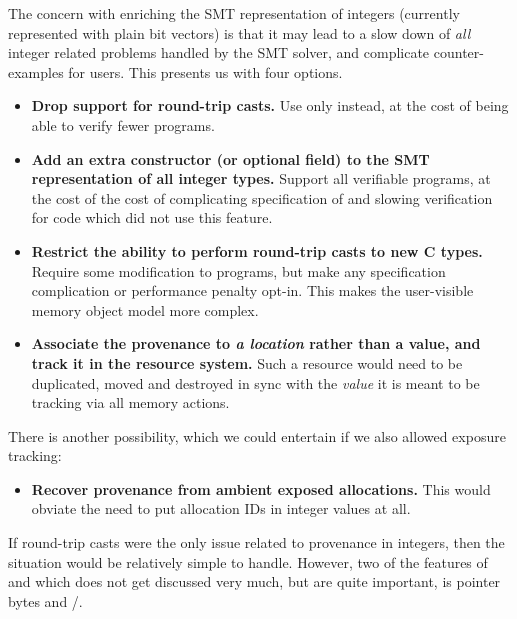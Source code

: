 The concern with enriching the SMT representation of integers (currently
represented with plain bit vectors) is that it may lead to a slow down of
\emph{all} integer related problems handled by the SMT solver, and complicate
counter-examples for users. This presents us with four options.
\begin{itemize}
    \item \textbf{Drop support for round-trip casts.} Use only
         instead, at the cost of being able
        to verify fewer programs.
    \item \textbf{Add an extra constructor (or optional field) to the SMT
        representation of all integer types.} Support all  verifiable
        programs, at the cost of the cost of complicating specification of
        and slowing verification for code which did not use this feature.
    \item \textbf{Restrict the ability to perform round-trip casts to new C
        types.} Require some modification to  programs, but
        make any specification complication or performance penalty opt-in. This
        makes the user-visible memory object model more complex.\label{sn:optin-typedef-subtype}
    \item \textbf{Associate the provenance to \emph{a location} rather than a
        value, and track it in the resource system.} Such a resource would need
        to be duplicated, moved and destroyed in sync with the \emph{value} it
        is meant to be tracking via all memory actions.
\end{itemize}

There is another possibility, which we could entertain if we also allowed
exposure tracking:
\begin{itemize}
    \item \textbf{Recover provenance from ambient exposed allocations.} This
        would obviate the need to put allocation IDs in integer values at all.
\end{itemize}

If round-trip casts were the only issue related to provenance in integers, then
the situation would be relatively simple to handle. However, two of the
features of  and  which does not get discussed very
much, but are quite important, is pointer bytes and
/.

